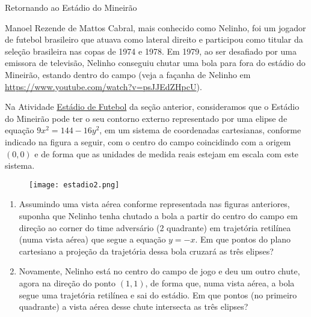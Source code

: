 \begin{task}{Retornando ao Estádio do Mineirão}
\label{estadio2}

Manoel Rezende de Mattos Cabral, mais conhecido como Nelinho, foi um jogador de futebol brasileiro que atuava como lateral direito e participou como titular da seleção brasileira nas copas de 1974 e 1978. Em 1979, ao ser desafiado por uma emissora de televisão, Nelinho conseguiu chutar uma bola para fora do estádio do Mineirão, estando dentro do campo (veja a façanha de Nelinho em \url{https://www.youtube.com/watch?v=psJJEdZHpcU}).


Na Atividade \hyperref[estadio]{Estádio de Futebol} da seção anterior, consideramos que o Estádio do Mineirão pode ter o seu contorno externo representado por uma elipse de equação $9x^2 = 144 - 16y^2$, em um sistema de coordenadas cartesianas, conforme indicado na figura a seguir, com o centro do campo coincidindo com a origem $(0,0)$ e de forma que as unidades de medida reais estejam em escala com este sistema.

\begin{figure}[H]
\centering

\noindent\texttt{[image: estadio2.png]}
\end{figure}
\begin{enumerate} 

\item{}
Assumindo uma vista aérea conforme representada nas figuras anteriores, suponha que Nelinho tenha chutado a bola a partir do centro do campo em direção ao corner do time adversário (2 quadrante) em trajetória retilínea (numa vista aérea) que segue a equação $y = -x$. Em que pontos do plano cartesiano a projeção da trajetória dessa bola cruzará as três elipses?

\item{}
Novamente, Nelinho está no centro do campo de jogo e deu um outro chute, agora na direção do ponto $(1,1)$, de forma que, numa vista aérea, a bola segue uma trajetória retilínea e sai do estádio. Em que pontos (no primeiro quadrante) a vista aérea desse chute intersecta as três elipses?

\end{enumerate}
\end{task}


\label{\detokenize{AF107-2:organizando-sistemas-de-equações}}\label{\detokenize{AF107-2::doc}}


